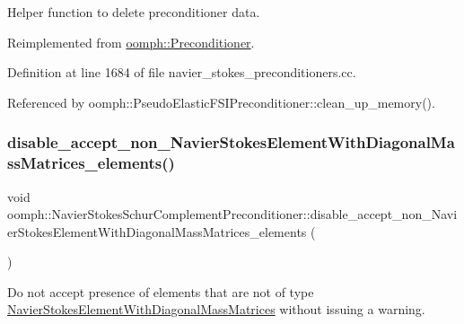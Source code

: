 Helper function to delete preconditioner data. 



Reimplemented from \hyperlink{classoomph_1_1Preconditioner_a46c31c416829bedcd9db238431262027}{oomph\+::\+Preconditioner}.



Definition at line 1684 of file navier\+\_\+stokes\+\_\+preconditioners.\+cc.



Referenced by oomph\+::\+Pseudo\+Elastic\+F\+S\+I\+Preconditioner\+::clean\+\_\+up\+\_\+memory().

\mbox{\label{classoomph_1_1NavierStokesSchurComplementPreconditioner_a483c96d41a5032f90b8027d6ef2c0c5a}} 
\subsubsection{\texorpdfstring{disable\+\_\+accept\+\_\+non\+\_\+\+Navier\+Stokes\+Element\+With\+Diagonal\+Mass\+Matrices\+\_\+elements()}{disable\_accept\_non\_NavierStokesElementWithDiagonalMassMatrices\_elements()}}
{\footnotesize\ttfamily void oomph\+::\+Navier\+Stokes\+Schur\+Complement\+Preconditioner\+::disable\+\_\+accept\+\_\+non\+\_\+\+Navier\+Stokes\+Element\+With\+Diagonal\+Mass\+Matrices\+\_\+elements (\begin{DoxyParamCaption}{ }\end{DoxyParamCaption})\hspace{0.3cm}{\ttfamily [inline]}}



Do not accept presence of elements that are not of type \hyperlink{classoomph_1_1NavierStokesElementWithDiagonalMassMatrices}{Navier\+Stokes\+Element\+With\+Diagonal\+Mass\+Matrices} without issuing a warning. 



